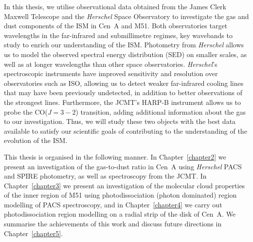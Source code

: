 In this thesis, we utilise observational data obtained from the James Clerk Maxwell Telescope and the \emph{Herschel} Space Observatory to investigate the gas and dust components of the ISM in Cen~A and M51.  Both observatories target wavelengths in the far-infrared and submillimetre regimes, key wavebands to study to enrich our understanding of the ISM.  Photometry from \emph{Herschel} allows us to model the observed spectral energy distribution (SED) on smaller scales, as well as at longer wavelengths than other space observatories.  \emph{Herschel}'s spectroscopic instruments have improved sensitivity and resolution over observatories such as ISO, allowing us to detect weaker far-infrared cooling lines that may have been previously undetected, in addition to better observations of the strongest lines.  Furthermore, the JCMT's HARP-B instrument allows us to probe the CO($J=3-2$) transition, adding additional information about the gas to our investigation.  Thus, we will study these two objects with the best data available to satisfy our scientific goals of contributing to the understanding of the evolution of the ISM.

This thesis is organised in the following manner.  In Chapter~\ref{chapter2} we present an investigation of the gas-to-dust ratio in Cen~A using \emph{Herschel} PACS and SPIRE photometry, as well as spectroscopy from the JCMT.  In Chapter~\ref{chapter3} we present an investigation of the molecular cloud properties of the inner region of M51 using photodissociation (photon dominated) region modelling of PACS spectroscopy, and in Chapter~\ref{chapter4} we carry out photodissociation region modelling on a radial strip of the disk of Cen~A.  We summarise the achievements of this work and discuss future directions in Chapter~\ref{chapter5}.

%
%


